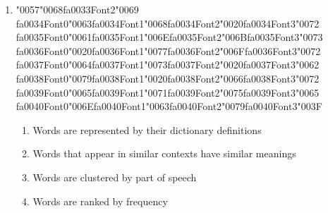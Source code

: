 \documentclass[12pt]{article}
\begin{document}
\begin{enumerate}[label=Q\arabic*.]
\begin{enumerate}[label=(\Alph*)]
\end{enumerate}
\item {\char"0057}{\char"0068}{\csname fa0033Font2\endcsname\char"0069} {\csname fa0034Font0\endcsname\char"0063}{\csname fa0034Font1\endcsname\char"0068}{\csname fa0034Font2\endcsname\char"0020}{\csname fa0034Font3\endcsname\char"0072} {\csname fa0035Font0\endcsname\char"0061}{\csname fa0035Font1\endcsname\char"006E}{\csname fa0035Font2\endcsname\char"006B}{\csname fa0035Font3\endcsname\char"0073} {\csname fa0036Font0\endcsname\char"0020}{\csname fa0036Font1\endcsname\char"0077}{\csname fa0036Font2\endcsname\char"006F}{\csname fa0036Font3\endcsname\char"0072} {\csname fa0037Font0\endcsname\char"0064}{\csname fa0037Font1\endcsname\char"0073}{\csname fa0037Font2\endcsname\char"0020}{\csname fa0037Font3\endcsname\char"0062} {\csname fa0038Font0\endcsname\char"0079}{\csname fa0038Font1\endcsname\char"0020}{\csname fa0038Font2\endcsname\char"0066}{\csname fa0038Font3\endcsname\char"0072} {\csname fa0039Font0\endcsname\char"0065}{\csname fa0039Font1\endcsname\char"0071}{\csname fa0039Font2\endcsname\char"0075}{\csname fa0039Font3\endcsname\char"0065} {\csname fa0040Font0\endcsname\char"006E}{\csname fa0040Font1\endcsname\char"0063}{\csname fa0040Font2\endcsname\char"0079}{\csname fa0040Font3\endcsname\char"003F}
\begin{enumerate}[label=(\Alph*)]
    \item Words are represented by their dictionary definitions
    \item Words that appear in similar contexts have similar meanings
    \item Words are clustered by part of speech
    \item Words are ranked by frequency
\end{enumerate}

\end{enumerate}
\end{document}

